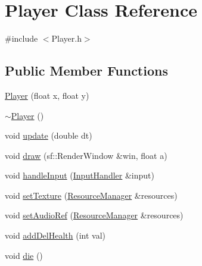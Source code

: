 \hypertarget{class_player}{}\section{Player Class Reference}
\label{class_player}


{\ttfamily \#include $<$Player.\+h$>$}

\subsection*{Public Member Functions}
\begin{DoxyCompactItemize}
\item 
\mbox{\hyperlink{class_player_a4c481b6493f9e0d550377c0d99763c82}{Player}} (float x, float y)
\item 
\mbox{\hyperlink{class_player_a749d2c00e1fe0f5c2746f7505a58c062}{$\sim$\+Player}} ()
\item 
void \mbox{\hyperlink{class_player_a9117f98ab1e6f0d58c099f3c721f4906}{update}} (double dt)
\item 
void \mbox{\hyperlink{class_player_a1c35f5008d1753ae66caec787a98171e}{draw}} (sf\+::\+Render\+Window \&win, float a)
\item 
void \mbox{\hyperlink{class_player_a9a2292e396c2b77758dde50adbed38d4}{handle\+Input}} (\mbox{\hyperlink{class_input_handler}{Input\+Handler}} \&input)
\item 
void \mbox{\hyperlink{class_player_ad473d94189017b621f4471ed2d3fb73d}{set\+Texture}} (\mbox{\hyperlink{class_resource_manager}{Resource\+Manager}} \&resources)
\item 
void \mbox{\hyperlink{class_player_a8ec53df67585a2b4fdb57359bff28c93}{set\+Audio\+Ref}} (\mbox{\hyperlink{class_resource_manager}{Resource\+Manager}} \&resources)
\item 
void \mbox{\hyperlink{class_player_ae05f7bcbebe0c8e284f9138db51be539}{add\+Del\+Health}} (int val)
\item 
void \mbox{\hyperlink{class_player_a1e4b3e6ef91fc400ff2c6c26b1370f8c}{die}} ()
\end{DoxyCompactItemize}
